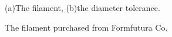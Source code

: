\begin{figure}[htbp] %
	\centering
  \caption{The filament purchased from Formfutura Co.}{\footnotesize  (a)The filament, (b)the diameter tolerance. }
  \label{Fig:filament}
\end{figure}


